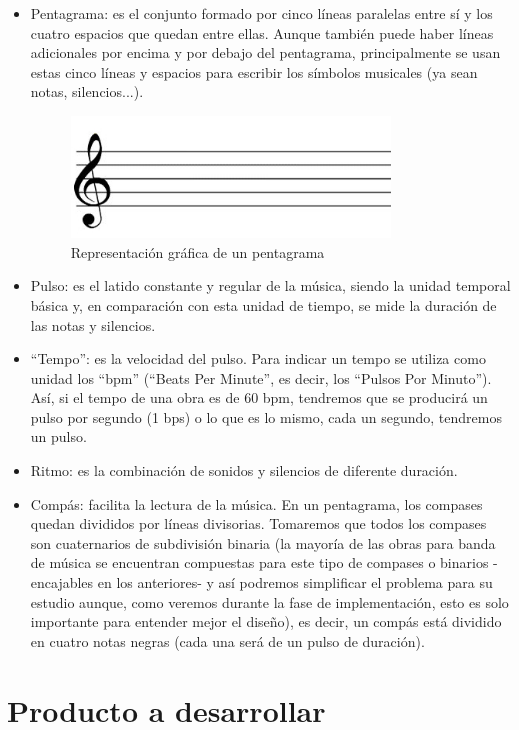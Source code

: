 \begin{itemize}
\item Pentagrama: es el conjunto formado por cinco líneas paralelas entre sí y los cuatro espacios que quedan entre ellas. Aunque también puede haber líneas adicionales por encima y por debajo del pentagrama, principalmente se usan estas cinco líneas y espacios para escribir los símbolos musicales (ya sean notas, silencios...).
  \begin{figure}[htb]
  \centering
  \includegraphics[width=0.8\textwidth]{./imagenes/pentagrama}
  \caption{Representación gráfica de un pentagrama} \label{fig:pentagrama}
  \end{figure}
\item Pulso: es el latido constante y regular de la música, siendo la unidad temporal básica y, en comparación con esta unidad de tiempo, se mide la duración de las notas y silencios.
\item “Tempo”: es la velocidad del pulso. Para indicar un tempo se utiliza como unidad los “bpm” (“Beats Per Minute”, es decir, los “Pulsos Por Minuto”). Así, si el tempo de una obra es de 60 bpm, tendremos que se producirá un pulso por segundo (1 bps) o lo que es lo mismo, cada un segundo, tendremos un pulso.
\item Ritmo: es la combinación de sonidos y silencios de diferente duración.
\item Compás: facilita la lectura de la música. En un pentagrama, los compases quedan divididos por líneas divisorias. Tomaremos que todos los compases son cuaternarios de subdivisión binaria (la mayoría de las obras para banda de música se encuentran compuestas para este tipo de compases o binarios -encajables en los anteriores- y así podremos simplificar el problema para su estudio aunque, como veremos durante la fase de implementación, esto es solo importante para entender mejor el diseño), es decir, un compás está dividido en cuatro notas negras (cada una será de un pulso de duración).
\end{itemize}

\section{Producto a desarrollar}

